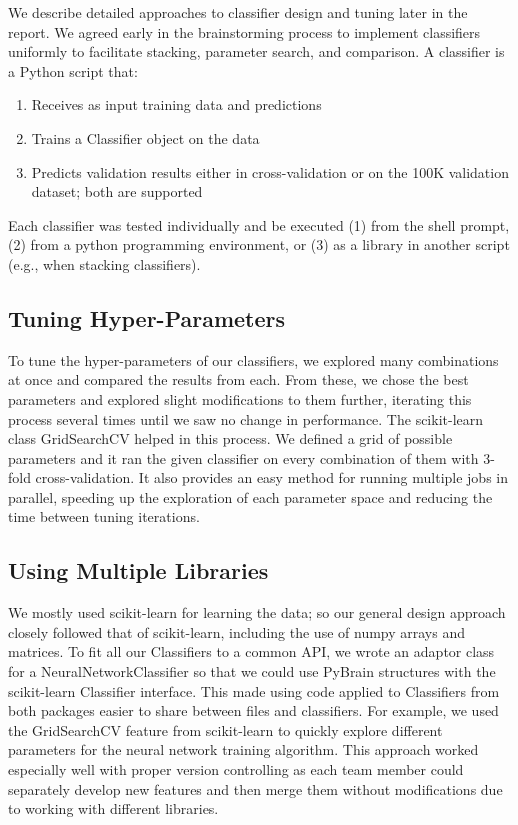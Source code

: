 \documentclass{article}
\begin{document}
We describe detailed approaches to classifier design and tuning later in the report. 
We agreed early in the brainstorming process to implement classifiers uniformly to facilitate stacking, parameter search, and comparison. 
A classifier is a Python script that: 

\begin{enumerate}
\item Receives as input training data and predictions
\item Trains a Classifier object on the data
\item Predicts validation results either in cross-validation or on the 100K validation dataset; both are supported 
\end{enumerate}

Each classifier was tested individually and be executed (1) from the shell prompt, (2) from a python programming environment, or (3) as a library in another script (e.g., when stacking classifiers).

\subsection{Tuning Hyper-Parameters}
\label{tuning_parameters}

To tune the hyper-parameters of our classifiers, we explored many combinations at once and compared the results from each.
From these, we chose the best parameters and explored slight modifications to them further, iterating this process several times until we saw no change in performance.
The scikit-learn class GridSearchCV helped in this process.
We defined a grid of possible parameters and it ran the given classifier on every combination of them with 3-fold cross-validation.
It also provides an easy method for running multiple jobs in parallel, speeding up the exploration of each parameter space and reducing the time between tuning iterations.

\subsection{Using Multiple Libraries}
\label{multiple_libraries}

We mostly used scikit-learn for learning the data; so our general design approach closely followed that of scikit-learn, including the use of numpy arrays and matrices.
To fit all our Classifiers to a common API, we wrote an adaptor class for a NeuralNetworkClassifier so that we could use PyBrain structures with the scikit-learn Classifier interface.
This made using code applied to Classifiers from both packages easier to share between files and classifiers.
For example, we used the GridSearchCV feature from scikit-learn to quickly explore different parameters for the neural network training algorithm.
This approach worked especially well with proper version controlling as each team member could separately develop new features and then merge them without modifications due to working with different libraries.
\end{document}
